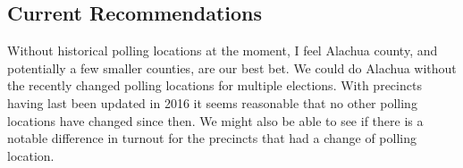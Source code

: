 \documentclass[12pt]{article}
\begin{document}
\clearpage

\subsection{Current Recommendations}

Without historical polling locations at the moment, I feel Alachua county, and potentially a few smaller counties, are our best bet.  We could do Alachua without the recently changed polling locations for multiple elections. With precincts having last been updated in 2016 it seems reasonable that no other polling locations have changed since then. We might also be able to see if there is a notable difference in turnout for the precincts that had a change of polling location.
\end{document}
